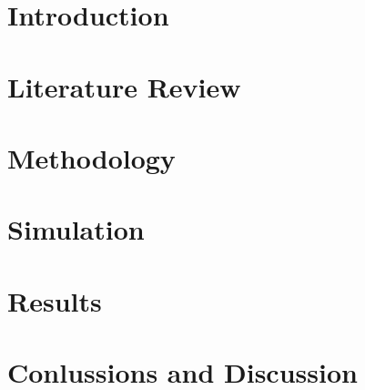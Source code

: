 \documentclass[pdftex]{pucthesis}	%
\begin{document}
\chapter[Introduction]{Introduction}
\label{chapter:introduction}


\chapter[Literature Review]{Literature Review}
\label{chapter:literature_review}


\chapter[Methodology]{Methodology}
\label{chapter:methodology}


\chapter[Simulation]{Simulation}
\label{chapter:simulation}


\chapter[Results]{Results}
\label{chapter:results}


\chapter[Conlusions and Discussion]{Conlussions and Discussion} 
\label{chapter:conclusions}




\cleardoublepage
{} \label{references}

\renewcommand{\bibname}{REFERENCES}

\setlength{\bibleftmargin}{0em}
\setlength{\bibindent}{0em}
\setlength{\bibitemsep}{1em}


\end{document}
